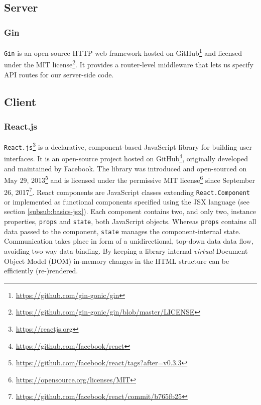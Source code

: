 \subsection{Server}
\label{sub:basics-server}

\subsubsection{Gin}
\label{subsub:basics-gin}

\texttt{Gin} is an open-source HTTP web framework hosted on GitHub\footnote{\url{https://github.com/gin-gonic/gin}} and licensed under the MIT license\footnote{\url{https://github.com/gin-gonic/gin/blob/master/LICENSE}}.
It provides a router-level middleware that lets us specify API routes for our server-side code.

\subsection{Client}
\label{sub:basics-client}

\subsubsection{React.js}
\label{subsub:basics-reactjs}

\texttt{React.js}\footnote{\url{https://reactjs.org}} is a declarative, component-based JavaScript library for building user interfaces. 
It is an open-source project hosted on GitHub\footnote{\url{https://github.com/facebook/react}}, originally developed and maintained by Facebook.
The library was introduced and open-sourced on May 29, 2013\footnote{\url{https://github.com/facebook/react/tags?after=v0.3.3}} and is licensed under the permissive MIT license\footnote{\url{https://opensource.org/licenses/MIT}} since September 26, 2017\footnote{\url{https://github.com/facebook/react/commit/b765fb25}}.
React components are JavaScript classes extending \texttt{React.Component} or implemented as functional components specified using the JSX language (see section \ref{subsub:basics-jsx}). Each component contains two, and only two, instance properties, \texttt{props} and \texttt{state}, both JavaScript objects. Whereas \texttt{props} contains all data passed to the component, \texttt{state} manages the component-internal state. Communication takes place in form of a unidirectional, top-down data data flow, avoiding two-way data binding. By keeping a library-internal \textit{virtual} Document Object Model (DOM) in-memory changes in the HTML structure can be efficiently (re-)rendered.

